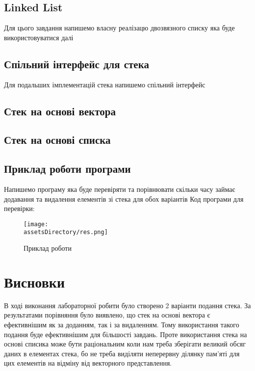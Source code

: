 \subsection{Linked List}
Для цього завдання напишемо власну реалізацю двозвязного списку яка буде використовуватися далі



\newpage
\subsection{Спільний інтерфейс для стека}
Для подальших імплементацій стека напишемо спільний інтерфейс


\newpage
\subsection{Стек на основі вектора}


\newpage
\subsection{Стек на основі списка}


\newpage
\subsection{Приклад роботи програми}
Напишемо програму яка буде перевіряти та порівнювати скільки часу займає додавання та видалення елементів зі стека для обох варіантів
\noindent
Код програми для перевірки:


\begin{figure}[ht!]
    \centering
    \texttt{[image: \\assetsDirectory/res.png]}
    \caption{Приклад роботи}
\end{figure}


\newpage
\section{Висновки}
В ході виконання лабораторної робити було створено 2 варіанти подання стека.
За результатами порівняння було виявлено, що стек на основі вектора є ефективнішим як за доданням, так і за видаленням.
Тому використання такого подання буде ефективнішим для більшості завдань.
Проте використання стека на основі списика може бути раціональним коли нам треба зберігати великий обсяг даних в елементах стека,
бо не треба виділяти неперервну ділянку пам'яті для цих елементів на відміну від векторного представлення.
